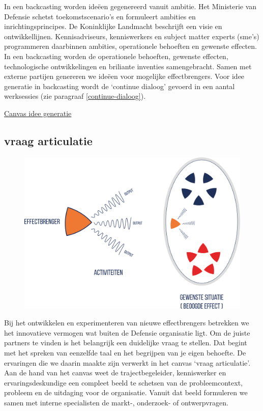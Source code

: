 \documentclass[
]{book}
\begin{document}
In een backcasting worden ideëen gegenereerd vanuit ambitie. Het Ministerie van Defensie schetst toekomstscenario's en formuleert ambities en inrichtingsprincipes. De Koninklijke Landmacht beschrijft een visie en ontwikkellijnen. Kennisadviseurs, kenniswerkers en subject matter experts (sme's) programmeren daarbinnen ambities, operationele behoeften en gewenste effecten. In een backcasting worden de operationele behoeften, gewenste effecten, technologische ontwikkelingen en briliante inventies samengebracht. Samen met externe partijen genereren we ideëen voor mogelijke effectbrengers. Voor idee generatie in backcasting wordt de `continue dialoog' gevoerd in een aantal werksessies (zie paragraaf \ref{continue-dialoog}).

\href{data/images/20200116-CDE-canvassen-ideegeneratie.png}{Canvas idee generatie}

\hypertarget{vraag-articulatie}{%
\subsection{vraag articulatie}\label{vraag-articulatie}}

\begin{figure}

{\centering \includegraphics[width=450pt]{data/images/20210324-MDI-effectbrenger-ei} 

}

\caption{ }\label{fig:unnamed-chunk-9}
\end{figure}

Bij het ontwikkelen en experimenteren van nieuwe effectbrengers betrekken we het innovatieve vermogen wat buiten de Defensie organisatie ligt. Om de juiste partners te vinden is het belangrijk een duidelijke vraag te stellen. Dat begint met het spreken van eenzelfde taal en het begrijpen van je eigen behoefte. De ervaringen die we daarin maakte zijn verwerkt in het canvas `vraag articulatie'. Aan de hand van het canvas weet de trajectbegeleider, kenniswerker en ervaringsdeskundige een compleet beeld te schetsen van de probleemcontext, probleem en de uitdaging voor de organisatie. Vanuit dat beeld formuleren we samen met interne specialisten de markt-, onderzoek- of ontwerpvragen.
\end{document}
